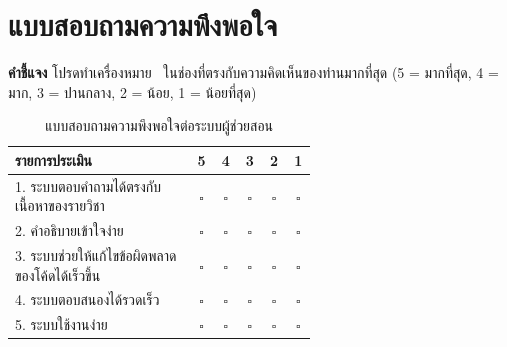 \chapter{แบบสอบถามความพึงพอใจ}
\label{app:questionnaire}

\noindent\textbf{คำชี้แจง} โปรดทำเครื่องหมาย \checkmark\ ในช่องที่ตรงกับความคิดเห็นของท่านมากที่สุด
(5 = มากที่สุด, 4 = มาก, 3 = ปานกลาง, 2 = น้อย, 1 = น้อยที่สุด)

\begin{table}[H]
  \caption{แบบสอบถามความพึงพอใจต่อระบบผู้ช่วยสอน}
  \label{tab:questionnaire}
  \centering
  \begin{tabular}{@{}p{0.6\linewidth}ccccc@{}}
    \toprule
    \textbf{รายการประเมิน} & \textbf{5} & \textbf{4} & \textbf{3} & \textbf{2} & \textbf{1}\\
    \midrule
    1. ระบบตอบคำถามได้ตรงกับเนื้อหาของรายวิชา & $\square$ & $\square$ & $\square$ & $\square$ & $\square$\\
    2. คำอธิบายเข้าใจง่าย & $\square$ & $\square$ & $\square$ & $\square$ & $\square$\\
    3. ระบบช่วยให้แก้ไขข้อผิดพลาดของโค้ดได้เร็วขึ้น & $\square$ & $\square$ & $\square$ & $\square$ & $\square$\\
    4. ระบบตอบสนองได้รวดเร็ว & $\square$ & $\square$ & $\square$ & $\square$ & $\square$\\
    5. ระบบใช้งานง่าย & $\square$ & $\square$ & $\square$ & $\square$ & $\square$\\
    \bottomrule
  \end{tabular}
\end{table}
